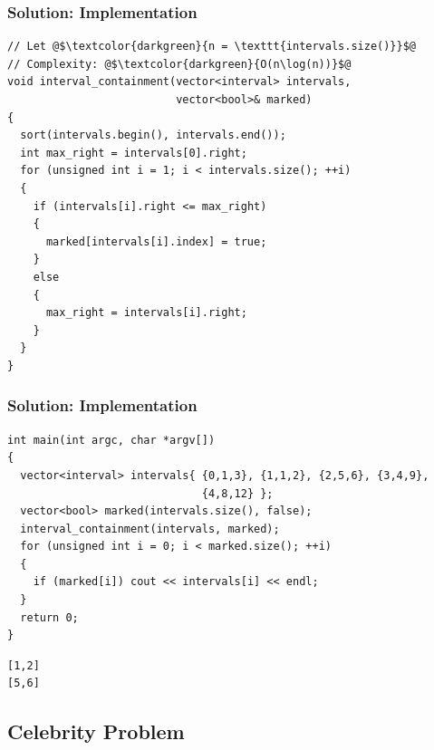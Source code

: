 \documentclass{beamer}
\begin{document}
\begin{frame}[containsverbatim]
\frametitle{Solution: Implementation}

\scriptsize
\begin{lstlisting}
// Let @$\textcolor{darkgreen}{n = \texttt{intervals.size()}}$@
// Complexity: @$\textcolor{darkgreen}{O(n\log(n))}$@
void interval_containment(vector<interval> intervals,
                          vector<bool>& marked)
{
  sort(intervals.begin(), intervals.end());
  int max_right = intervals[0].right;
  for (unsigned int i = 1; i < intervals.size(); ++i)
  {
    if (intervals[i].right <= max_right)
    {
      marked[intervals[i].index] = true;
    }
    else
    {
      max_right = intervals[i].right;
    }
  }
}
\end{lstlisting}

\end{frame}

\begin{frame}[containsverbatim]
\frametitle{Solution: Implementation}

\scriptsize
\begin{lstlisting}
int main(int argc, char *argv[])
{
  vector<interval> intervals{ {0,1,3}, {1,1,2}, {2,5,6}, {3,4,9},
                              {4,8,12} };
  vector<bool> marked(intervals.size(), false);
  interval_containment(intervals, marked);
  for (unsigned int i = 0; i < marked.size(); ++i)
  {
    if (marked[i]) cout << intervals[i] << endl;
  }
  return 0;
}
\end{lstlisting}

\begin{verbatim}
[1,2]
[5,6]
\end{verbatim}

\end{frame}

\subsection{Celebrity Problem}
\end{document}
